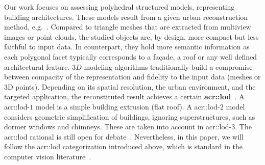 \documentclass[runningheads]{llncs}
\begin{document}
    Our work focuses on assessing polyhedral structured models, representing building architectures. These models result from a given urban reconstruction method, e.g.~\cite{dick2004modelling}. Compared to triangle meshes that are extracted from multiview images or point clouds, the studied objects are, by design, more compact but less faithful to input data. In counterpart, they hold more semantic information as each polygonal facet typically corresponds to a fa\c{c}ade, a roof or any well defined architectural feature. $3D$ modeling algorithms traditionally build a compromise between compacity of the representation and fidelity to the input data (meshes or 3D points). Depending on its spatial resolution, the urban environment, and the targeted application, the reconstituted result achieves a certain \textbf{\gls{acr::lod}}~\cite{kolbe2005citygml}. A \acrshort{acr::lod}-$1$ model is a simple building extrusion (flat roof). A \acrshort{acr::lod}-$2$ model considers geometric simplification of buildings, ignoring superstructures, such as dormer windows and chimneys. These are taken into account in \acrshort{acr::lod}-$3$. The \acrshort{acr::lod} rational is still open for debate~\cite{2016_ceus_improved_lod}. Nevertheless, in this paper, we will follow the \acrshort{acr::lod} categorization introduced above, which is standard in the computer vision literature~\cite{verdie2015lod}.
\end{document}
